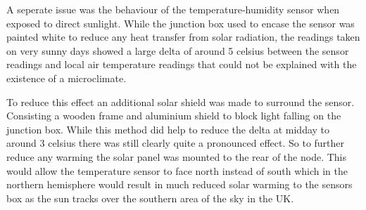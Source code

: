 A seperate issue was the behaviour of the temperature-humidity sensor when
exposed to direct sunlight. While the junction box used to encase the sensor was
painted white to reduce any heat transfer from solar radiation, the readings
taken on very sunny days showed a large delta of around 5 celsius between the
sensor readings and local air temperature readings that could not be explained
with the existence of a microclimate.

To reduce this effect an additional solar shield was made to surround the
sensor. Consisting a wooden frame and aluminium shield to block light falling on
the junction box. While this method did help to reduce the delta at midday to
around 3 celsius there was still clearly quite a pronounced effect. So to
further reduce any warming the solar panel was mounted to the rear of the node.
This would allow the temperature sensor to face north instead of south which in
the northern hemisphere would result in much reduced solar warming to the
sensors box as the sun tracks over the southern area of the sky in the UK.
